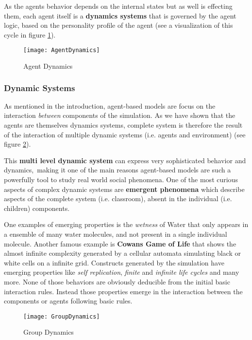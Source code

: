 As the agents behavior depends on the internal states but as well is effecting them,
each agent itself is a \textbf{dynamics systems} that is governed by the agent logic, based
on the personality profile of the agent (see a visualization of this cycle in figure \ref{AgentDynamics}).

\begin{figure}[]
    \centering
    \texttt{[image: AgentDynamics]} 
    \caption{Agent Dynamics}
    \label{AgentDynamics}
\end{figure}

\subsubsection{Dynamic Systems}
As mentioned in the introduction, agent-based models are focus on the interaction
\textit{between} components of the simulation. As we have shown that the agents
are themselves dynamics systems, complete system is therefore the result of the
interaction of multiple dynamic systems (i.e. agents and environment)
(see figure \ref{GroupDynamics}). 

\bb

This \textbf{multi level dynamic system} can express very sophisticated behavior and dynamics,\
making it one of the main reasons agent-based models are such a powerfully tool to study
real world social phenomena. One of the most curious aspects of complex dynamic systems
are \textbf{emergent phenomena}\cite{Corning2002} which describe aspects of the
complete system (i.e. classroom), absent in the individual (i.e. children) components.

\bb

One examples of emerging properties is the \textit{wetness} of Water that only appears in a
ensemble of many water molecules, and not present in a single individual molecule. 
Another famous example is \textbf{Cowans Game of Life}\cite{Adamatzky2010}
that shows the almost infinite complexity generated by a cellular automata simulating
black or white cells on a infinite grid. Constructs generated by the simulation
have emerging properties like \textit{self replication}, \textit{finite} and
\textit{infinite life cycles} and many more. None of those behaviors are obviously deducible
from the initial basic interaction rules. Instead those properties emerge in the
interaction between the components or agents following basic rules.

\begin{figure}[]
    \centering
    \texttt{[image: GroupDynamics]} 
    \caption{Group Dynamics}
    \label{GroupDynamics}
\end{figure}

